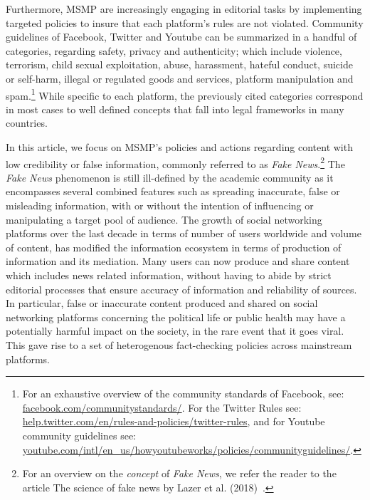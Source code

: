 \documentclass{article}
\begin{document}
\smallskip

Furthermore, MSMP are increasingly engaging in editorial tasks by implementing targeted policies to insure that each platform's rules are not violated. Community guidelines of Facebook, Twitter and Youtube can be summarized in a handful of categories, regarding safety, privacy and authenticity; which include violence, terrorism, child sexual exploitation, abuse, harassment, hateful conduct, suicide or self-harm, illegal or regulated goods and services, platform manipulation and spam.\footnote{For an exhaustive overview of the community standards of Facebook, see: \href{https://www.facebook.com/communitystandards/}{facebook.com/communitystandards/}. For the Twitter  Rules see: \href{https://help.twitter.com/en/rules-and-policies/twitter-rules}{help.twitter.com/en/rules-and-policies/twitter-rules}, and for Youtube community guidelines see: \href{https://www.youtube.com/intl/en\_us/howyoutubeworks/policies/community\-guidelines/}{youtube.com/intl/en\_us/howyoutubeworks/policies/community\-guidelines/}.} While specific to each platform, the previously cited categories correspond in most cases to well defined concepts that fall into legal frameworks in many countries. 

\smallskip

In this article, we focus on MSMP's policies and actions regarding content with low credibility or false information, commonly referred to as {\it Fake News}.\footnote{For an overview on the {\it concept} of {\it Fake News}, we refer the reader to the article The science of fake news by Lazer et al. (2018)~\cite{lazer}.} The {\it Fake News} phenomenon is still ill-defined by the academic community as it encompasses several combined features such as spreading inaccurate, false or misleading information, with or without the intention of influencing or manipulating a target pool of audience. The growth of social networking platforms over the last decade in terms of number of users worldwide and volume of content, has modified the information ecosystem in terms of production of information and its mediation. Many users can now produce and share content which includes news related information, without having to abide by strict editorial processes that ensure accuracy of information and reliability of sources. In particular, false or inaccurate content produced and shared on social networking platforms concerning the political life or public health may have a potentially harmful impact on the society, in the rare event that it goes viral. This gave rise to a set of heterogenous fact-checking policies across mainstream platforms.
 
\end{document}
